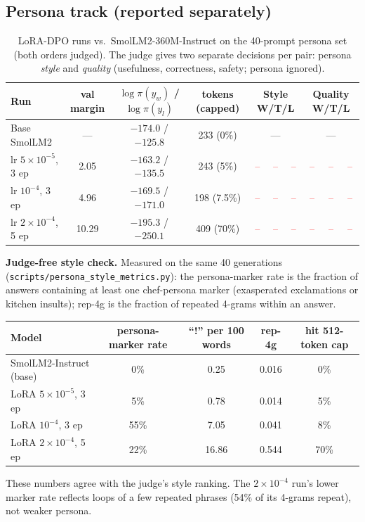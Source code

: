 \documentclass[10pt]{article}
\newcommand{\res}[1]{\textcolor{red}{#1}}
\newcommand{\pend}{\res{--}}
\providecommand{\RowLoraA}{\pend & \pend & \pend & \pend & \pend & \pend}
\providecommand{\RowLoraB}{\pend & \pend & \pend & \pend & \pend & \pend}
\providecommand{\RowLoraC}{\pend & \pend & \pend & \pend & \pend & \pend}
\newcommand{\code}[1]{\texttt{\small #1}}
\begin{document}
\subsection{Persona track (reported separately)}\label{sec:lora}
\begin{table}[!htbp]
\centering\small
\caption{LoRA-DPO runs vs.\ SmolLM2-360M-Instruct on the 40-prompt persona set (both orders judged). The judge gives two separate
decisions per pair: persona \emph{style} and \emph{quality} (usefulness, correctness, safety; persona ignored).}
\label{tab:lora}
\begin{tabular}{@{}l cc c ccc ccc@{}}
\toprule
Run & val margin & $\log\pi(y_w)$ / $\log\pi(y_l)$ & tokens (capped) & \multicolumn{3}{c}{Style W/T/L} & \multicolumn{3}{c}{Quality W/T/L} \\
\midrule
Base SmolLM2 & --- & $-174.0$ / $-125.8$ & 233 (0\%) & \multicolumn{3}{c}{---} & \multicolumn{3}{c}{---} \\
lr $5\!\times\!10^{-5}$, 3 ep & 2.05 & $-163.2$ / $-135.5$ & 243 (5\%) & \RowLoraA \\
lr $10^{-4}$, 3 ep & 4.96 & $-169.5$ / $-171.0$ & 198 (7.5\%) & \RowLoraB \\
lr $2\!\times\!10^{-4}$, 5 ep & 10.29 & $-195.3$ / $-250.1$ & 409 (70\%) & \RowLoraC \\
\bottomrule
\end{tabular}
\end{table}

\textbf{Judge-free style check.} Measured on the same 40 generations (\code{scripts/persona\_style\_metrics.py}): the persona-marker
rate is the fraction of answers containing at least one chef-persona marker (exasperated exclamations or kitchen insults); rep-4g is the fraction of
repeated 4-grams within an answer.
\begin{center}\small
\begin{tabular}{@{}lcccc@{}}
\toprule
Model & persona-marker rate & ``!'' per 100 words & rep-4g & hit 512-token cap \\
\midrule
SmolLM2-Instruct (base) & 0\% & 0.25 & 0.016 & 0\% \\
LoRA $5\!\times\!10^{-5}$, 3 ep & 5\% & 0.78 & 0.014 & 5\% \\
LoRA $10^{-4}$, 3 ep & 55\% & 7.05 & 0.041 & 8\% \\
LoRA $2\!\times\!10^{-4}$, 5 ep & 22\% & 16.86 & 0.544 & 70\% \\
\bottomrule
\end{tabular}
\end{center}
These numbers agree with the judge's style ranking. The $2\!\times\!10^{-4}$ run's lower marker rate reflects loops of a few
repeated phrases (54\% of its 4-grams repeat), not weaker persona.
\end{document}
